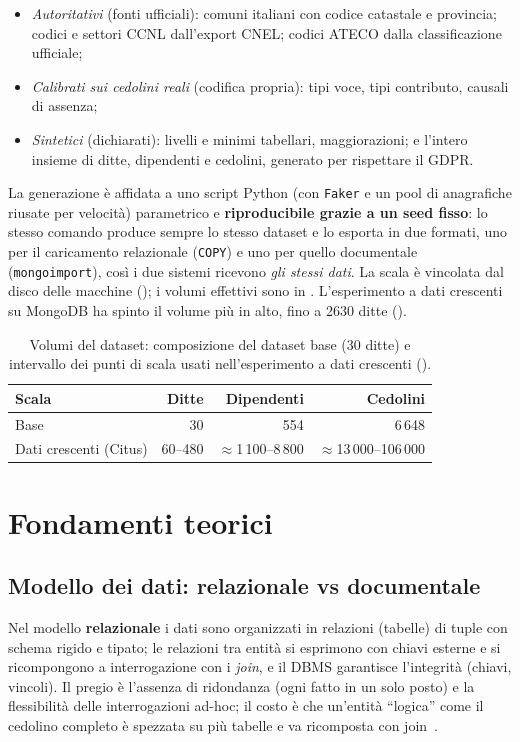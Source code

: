 \begin{itemize}
  \item \emph{Autoritativi} (fonti ufficiali): comuni italiani con codice catastale e provincia; codici e
        settori CCNL dall'export CNEL; codici ATECO dalla classificazione ufficiale;
  \item \emph{Calibrati sui cedolini reali} (codifica propria): tipi voce, tipi contributo, causali di assenza;
  \item \emph{Sintetici} (dichiarati): livelli e minimi tabellari, maggiorazioni; e l'intero insieme di
        ditte, dipendenti e cedolini, generato per rispettare il GDPR.
\end{itemize}

La generazione è affidata a uno script Python (con \texttt{Faker} e un pool di anagrafiche riusate per
velocità) parametrico e \textbf{riproducibile grazie a un seed fisso}: lo stesso comando produce sempre lo
stesso dataset e lo esporta in due formati, uno per il caricamento relazionale (\texttt{COPY}) e uno per
quello documentale (\texttt{mongoimport}), così i due sistemi ricevono \emph{gli stessi dati}. La scala è
vincolata dal disco delle macchine (); i volumi effettivi sono in .
L'esperimento a dati crescenti su MongoDB ha spinto il volume più in alto, fino a 2630 ditte
().

\begin{table}[htbp]
  \centering
  \caption{Volumi del dataset: composizione del dataset base (30 ditte) e intervallo dei punti di scala usati
    nell'esperimento a dati crescenti ().}
  \label{tab:volumi}
  \begin{tabular}{lrrr}
    \toprule
    \textbf{Scala} & \textbf{Ditte} & \textbf{Dipendenti} & \textbf{Cedolini} \\
    \midrule
    Base                       & 30      & 554                       & 6\,648 \\
    Dati crescenti (Citus)     & 60--480 & ${\approx}$1\,100--8\,800 & ${\approx}$13\,000--106\,000 \\
    \bottomrule
  \end{tabular}
\end{table}

\section{Fondamenti teorici}
\label{sec:fondamenti}

\subsection{Modello dei dati: relazionale vs documentale}
Nel modello \textbf{relazionale} i dati sono organizzati in relazioni (tabelle) di tuple con schema rigido e
tipato; le relazioni tra entità si esprimono con chiavi esterne e si ricompongono a interrogazione con i
\emph{join}, e il DBMS garantisce l'integrità (chiavi, vincoli). Il pregio è l'assenza di ridondanza (ogni
fatto in un solo posto) e la flessibilità delle interrogazioni ad-hoc; il costo è che un'entità ``logica''
come il cedolino completo è spezzata su più tabelle e va ricomposta con join~\cite{atzeni2018basidati}.


